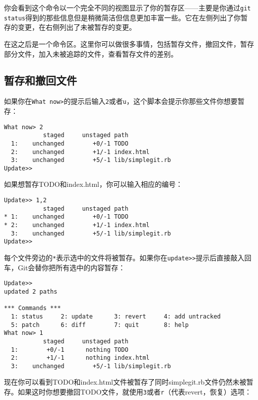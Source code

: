 \documentclass[a4paper]{book}
\begin{document}
你会看到这个命令以一个完全不同的视图显示了你的暂存区------主要是你通过\texttt{git status}得到的那些信息但是稍微简洁但信息更加丰富一些。它在左侧列出了你暂存的变更，在右侧列出了未被暂存的变更。

在这之后是一个命令区。这里你可以做很多事情，包括暂存文件，撤回文件，暂存部分文件，加入未被追踪的文件，查看暂存文件的差别。

\subsection{暂存和撤回文件}

如果你在\texttt{What now\textgreater{}}的提示后输入\texttt{2}或者\texttt{u}，这个脚本会提示你那些文件你想要暂存：

\begin{shaded}\begin{verbatim}
What now> 2
           staged     unstaged path
  1:    unchanged        +0/-1 TODO
  2:    unchanged        +1/-1 index.html
  3:    unchanged        +5/-1 lib/simplegit.rb
Update>>
\end{verbatim}\end{shaded}

如果想暂存TODO和index.html，你可以输入相应的编号：

\begin{shaded}\begin{verbatim}
Update>> 1,2
           staged     unstaged path
* 1:    unchanged        +0/-1 TODO
* 2:    unchanged        +1/-1 index.html
  3:    unchanged        +5/-1 lib/simplegit.rb
Update>>
\end{verbatim}\end{shaded}

每个文件旁边的\texttt{*}表示选中的文件将被暂存。如果你在\texttt{update\textgreater{}\textgreater{}}提示后直接敲入回车，Git会替你把所有选中的内容暂存：

\begin{shaded}\begin{verbatim}
Update>> 
updated 2 paths

*** Commands ***
  1: status     2: update      3: revert     4: add untracked
  5: patch      6: diff        7: quit       8: help
What now> 1
           staged     unstaged path
  1:        +0/-1      nothing TODO
  2:        +1/-1      nothing index.html
  3:    unchanged        +5/-1 lib/simplegit.rb
\end{verbatim}\end{shaded}

现在你可以看到TODO和index.html文件被暂存了同时simplegit.rb文件仍然未被暂存。如果这时你想要撤回TODO文件，就使用\texttt{3}或者\texttt{r}（代表revert，恢复）选项：
\end{document}
